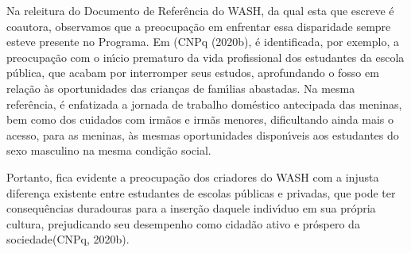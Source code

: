 \documentclass[
12pt,		%
openright,	%
twoside,  %
a4paper,			%
chapter=TITLE,		%
english,			%
french,				%
spanish,			%
brazil				%
]{USPSC-classe/USPSC}
\begin{document}
Na releitura do Documento de Refer\^encia do WASH, da qual esta que escreve \'e coautora, observamos que a preocupa\c{c}\~ao em enfrentar essa disparidade sempre esteve presente no Programa. Em  (CNPq (2020b), \'e identificada, por exemplo, a preocupa\c{c}\~ao com o in\'{\i}cio prematuro da vida profissional dos estudantes da escola p\'ublica, que acabam por interromper seus estudos, aprofundando o fosso em rela\c{c}\~ao \`as oportunidades das crian\c{c}as de fam\'{\i}lias abastadas. Na mesma refer\^encia, \'e enfatizada a jornada de trabalho dom\'estico antecipada  das meninas, bem como dos cuidados com irm\~aos e irm\~as menores, dificultando ainda mais o acesso, para as meninas, \`as mesmas oportunidades dispon\'{\i}veis aos estudantes do sexo masculino na mesma condi\c{c}\~ao social.

















Portanto, fica evidente a preocupa\c{c}\~ao dos criadores do WASH com a \textquotedbl injusta diferen\c{c}a existente entre estudantes de escolas p\'ublicas e privadas, que pode ter consequ\^encias duradouras para a inser\c{c}\~ao daquele indiv\'{\i}duo em sua pr\'opria cultura, prejudicando seu desempenho como cidad\~ao ativo e pr\'ospero da sociedade\textquotedbl  (CNPq, 2020b).


















\noindent\begin{center}\mbox{\centering{}}\end{center}
\end{document}
